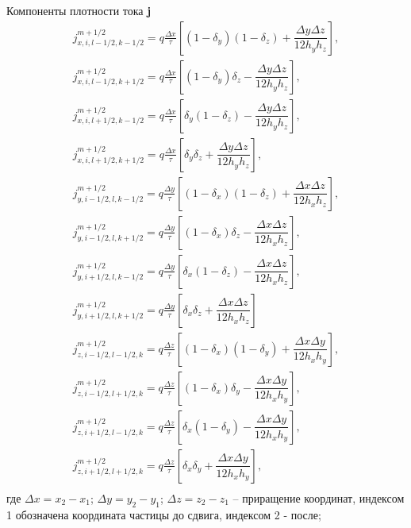 Компоненты плотности тока \textbf{j}
\begin{equation}
\begin{array}{c}
j_{x,i,l-1/2,k-1/2}^{m+1/2}=q\frac{\Delta x}{\tau}\left[(1-\delta_{y})(1-\delta_{z})+\dfrac{\Delta y \Delta z}{12 h_{y}h_{z}}
\right], \\
j_{x,i,l-1/2,k+1/2}^{m+1/2}=q\frac{\Delta x}{\tau}\left[(1-\delta_{y})\delta_{z}-\dfrac{\Delta y \Delta z}{12 h_{y}h_{z}}
\right], \\
j_{x,i,l+1/2,k-1/2}^{m+1/2}=q\frac{\Delta x}{\tau}\left[\delta_{y}(1-\delta_{z})-\dfrac{\Delta y \Delta z}{12 h_{y}h_{z}}
\right], \\
j_{x,i,l+1/2,k+1/2}^{m+1/2}=q\frac{\Delta x}{\tau}\left[\delta_{y}\delta_{z}+\dfrac{\Delta y \Delta z}{12 h_{y}h_{z}}
\right], \\
j_{y,i-1/2,l,k-1/2}^{m+1/2}=q\frac{\Delta y}{\tau}\left[(1-\delta_{x})(1-\delta_{z})+\dfrac{\Delta x \Delta z}{12 h_{x}h_{z}}
\right], \\
j_{y,i-1/2,l,k+1/2}^{m+1/2}=q\frac{\Delta y}{\tau}\left[(1-\delta_{x})\delta_{z}-\dfrac{\Delta x \Delta z}{12 h_{x}h_{z}}
\right], \\
j_{y,i+1/2,l,k-1/2}^{m+1/2}=q\frac{\Delta y}{\tau}\left[\delta_{x}(1-\delta_{z})-\dfrac{\Delta x \Delta z}{12 h_{x}h_{z}}
\right], \\
j_{y,i+1/2,l,k+1/2}^{m+1/2}=q\frac{\Delta y}{\tau}\left[\delta_{x}\delta_{z}+\dfrac{\Delta x \Delta z}{12 h_{x}h_{z}}
\right] \\
j_{z,i-1/2,l-1/2,k}^{m+1/2}=q\frac{\Delta z}{\tau}\left[(1-\delta_{x})(1-\delta_{y})+\dfrac{\Delta x \Delta y}{12 h_{x}h_{y}}
\right], \\
j_{z,i-1/2,l+1/2,k}^{m+1/2}=q\frac{\Delta z}{\tau}\left[(1-\delta_{x})\delta_{y}-\dfrac{\Delta x \Delta y}{12 h_{x}h_{y}}
\right], \\
j_{z,i+1/2,l-1/2,k}^{m+1/2}=q\frac{\Delta z}{\tau}\left[\delta_{x}(1-\delta_{y})-\dfrac{\Delta x \Delta y}{12 h_{x}h_{y}}
\right], \\
j_{z,i+1/2,l+1/2,k}^{m+1/2}=q\frac{\Delta z}{\tau}\left[\delta_{x}\delta_{y}+\dfrac{\Delta x \Delta y}{12 h_{x}h_{y}}
\right], \\
\end{array}
\end{equation}
где $\Delta x=x_2-x_1$; $\Delta y=y_2-y_1$; $\Delta z=z_2-z_1$ -- приращение координат, индексом 1 обозначена координата частицы до сдвига, индексом 2 - после; 

